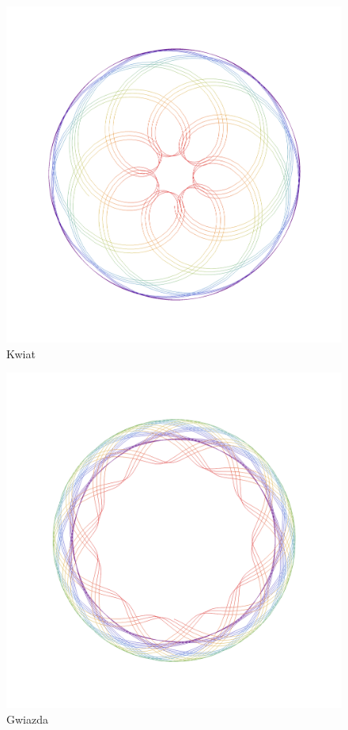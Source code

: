 %
\begin{figure}[tp]
  \centering
  \includegraphics[scale=0.5]{figures/chapter_06/mal5.pdf}
  \caption{Kwiat}
\end{figure}
%
\begin{figure}[tp]
  \centering
  \includegraphics[scale=0.5]{figures/chapter_06/mal8.pdf}
  \caption{Gwiazda}
\end{figure}
